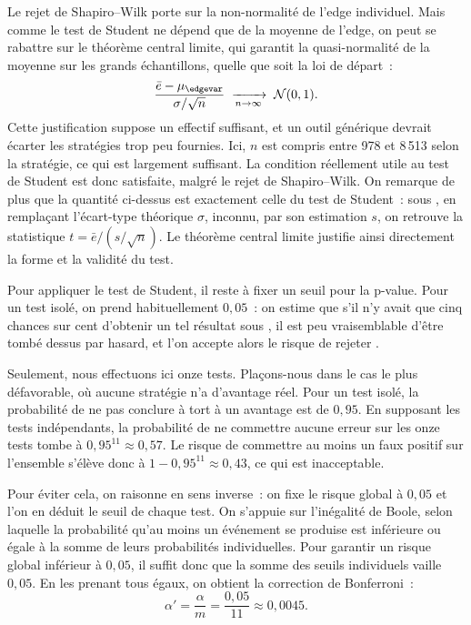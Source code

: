 
Le rejet de Shapiro--Wilk porte sur la non-normalité de l'edge
individuel. Mais comme le test de Student ne dépend que de la moyenne de
l'edge, on peut se rabattre sur le théorème central limite, qui garantit
la quasi-normalité de la moyenne sur les grands échantillons, quelle que
soit la loi de départ~:
\[
  \frac{\bar e - \mu_{\edgevar}}{\sigma/\sqrt{n}}
  \;\xrightarrow[n \to \infty]{}\; \mathcal{N}(0,1) .
\]
Cette justification suppose un effectif suffisant, et un outil générique
devrait écarter les stratégies trop peu fournies. Ici, \(n\) est compris
entre 978 et 8\,513 selon la stratégie, ce qui est largement suffisant.
La condition réellement utile au test de Student est donc satisfaite,
malgré le rejet de Shapiro--Wilk. On remarque de plus que la quantité
ci-dessus est exactement celle du test de Student~: sous \Hzero{}, en
remplaçant l'écart-type théorique \(\sigma\), inconnu, par son
estimation \(s\), on retrouve la statistique
\(t = \bar e/(s/\sqrt{n})\). Le théorème central limite justifie ainsi
directement la forme et la validité du test.


Pour appliquer le test de Student, il reste à fixer un seuil pour la
p-value. Pour un test isolé, on prend habituellement \(0{,}05\)~: on
estime que s'il n'y avait que cinq chances sur cent d'obtenir un tel
résultat sous \Hzero{}, il est peu vraisemblable d'être tombé dessus par
hasard, et l'on accepte alors le risque de rejeter \Hzero{}.

Seulement, nous effectuons ici onze tests. Plaçons-nous dans le cas le
plus défavorable, où aucune stratégie n'a d'avantage réel. Pour un test
isolé, la probabilité de ne pas conclure à tort à un avantage est de
\(0{,}95\). En supposant les tests indépendants, la probabilité de ne
commettre aucune erreur sur les onze tests tombe à
\(0{,}95^{11} \approx 0{,}57\). Le risque de commettre au moins un faux
positif sur l'ensemble s'élève donc à \(1 - 0{,}95^{11} \approx
0{,}43\), ce qui est inacceptable.

Pour éviter cela, on raisonne en sens inverse~: on fixe le risque global
à \(0{,}05\) et l'on en déduit le seuil de chaque test. On s'appuie sur
l'inégalité de Boole, selon laquelle la probabilité qu'au moins un
événement se produise est inférieure ou égale à la somme de leurs
probabilités individuelles. Pour garantir un risque global inférieur à
\(0{,}05\), il suffit donc que la somme des seuils individuels vaille
\(0{,}05\). En les prenant tous égaux, on obtient la correction de
Bonferroni~:
\[
  \alpha' = \frac{\alpha}{m} = \frac{0{,}05}{11} \approx 0{,}0045 .
\]

